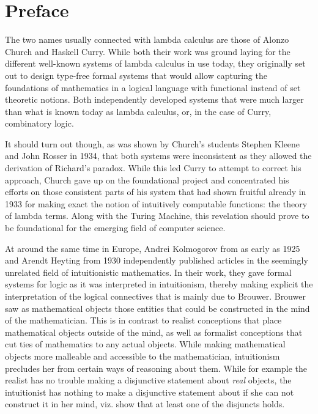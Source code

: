 \chapter[Preface]{Preface\LARGE{\footnotemark{}}}

The two names usually connected with lambda calculus are those of Alonzo Church
and Haskell Curry. While both their work was ground laying for the different
well-known systems of lambda calculus in use today, they originally set out to
design type-free formal systems that would allow capturing the foundations of
mathematics in a logical language with functional instead of set theoretic
notions. Both independently developed systems that were much larger than what is
known today as lambda calculus, or, in the case of Curry, combinatory logic.

It should turn out though, as was shown by Church's students Stephen Kleene and
John Rosser in 1934, that both systems were inconsistent as they allowed the
derivation of Richard's paradox. While this led Curry to attempt to correct his
approach, Church gave up on the foundational project and concentrated his efforts
on those consistent parts of his system that had shown fruitful already in 1933
for making exact the notion of intuitively computable functions: the theory of
lambda terms. Along with the Turing Machine, this revelation should prove to be
foundational for the emerging field of computer science.

At around the same time in Europe, Andrei Kolmogorov from as early as 1925 and
Arendt Heyting from 1930 independently published articles in the seemingly
unrelated field of intuitionistic mathematics. In their work, they gave formal
systems for logic as it was interpreted in intuitionism, thereby making explicit
the interpretation of the logical connectives that is mainly due to Brouwer.
Brouwer saw as mathematical objects those entities that could be constructed in
the mind of the mathematician. This is in contrast to realist conceptions that
place mathematical objects outside of the mind, as well as formalist conceptions
that cut ties of mathematics to any actual objects. While making mathematical
objects more malleable and accessible to the mathematician, intuitionism
precludes her from certain ways of reasoning about them. While for example the
realist has no trouble making a disjunctive statement about \textit{real}
objects, the intuitionist has nothing to make a disjunctive statement about if
she can not construct it in her mind, viz. show that at least one of the
disjuncts holds.

